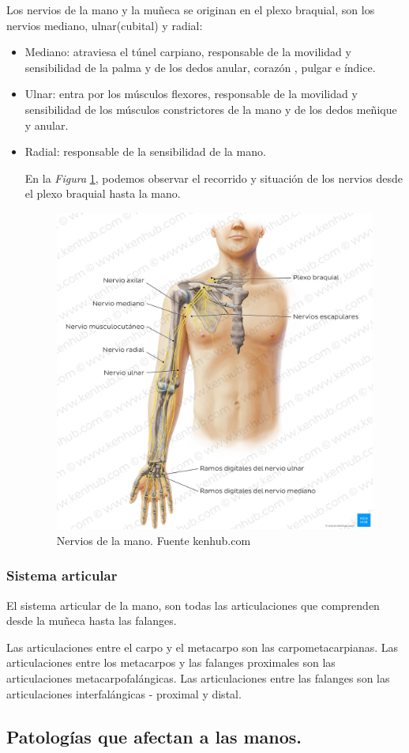 Los nervios de la mano y la muñeca se originan en el plexo braquial, son los nervios mediano, ulnar(cubital) y radial\cite{mano_anatomía}:
\begin{itemize}
    \item Mediano: atraviesa el túnel carpiano, responsable de la movilidad y sensibilidad de la palma y de los dedos anular, corazón , pulgar e índice.
    \item Ulnar: entra por los músculos flexores, responsable de la movilidad y sensibilidad de los músculos constrictores de la mano y de los dedos meñique y anular.
    \item Radial: responsable de la sensibilidad de la mano.


En la \textit{Figura} \ref{fig:nervios de la mano}, podemos observar el recorrido y situación de los nervios desde el plexo braquial hasta la mano.
\begin{figure}
    \centering
    \includegraphics[width=0.5\linewidth]{img/Mano_nervios.png}
    \caption{Nervios de la mano. Fuente kenhub.com}
    \label{fig:nervios de la mano}
\end{figure}
\end{itemize}
\subsubsection{Sistema articular}

El sistema articular de la mano, son todas las articulaciones que comprenden desde la muñeca hasta las falanges. 

Las articulaciones entre el carpo y el metacarpo son las carpometacarpianas. Las articulaciones entre los metacarpos y las falanges proximales son las articulaciones metacarpofalángicas. Las articulaciones entre las falanges son las articulaciones interfalángicas - proximal y distal. \cite{huesos_mano}
\subsection{Patologías que afectan a las manos.}

